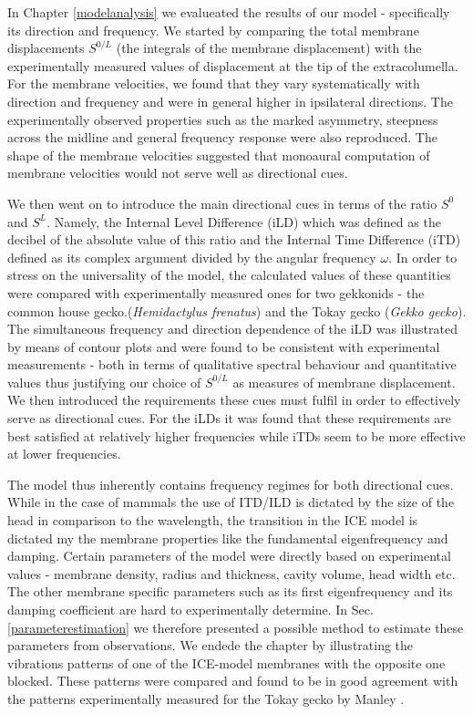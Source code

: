 In Chapter \ref{modelanalysis} we evalueated the results of our model - specifically its direction and frequency. We started
by comparing the total membrane displacements $S^{0/L}$ (the integrals of the membrane displacement) with the experimentally 
measured values of displacement at the tip of the extracolumella. 
For the membrane velocities, we found that they vary systematically with
direction and frequency and were in general higher in ipsilateral directions. The experimentally observed properties such
as the marked asymmetry, steepness across the midline and general frequency response were also reproduced. The shape of the membrane
velocities suggested that monoaural computation of membrane velocities would not serve well as directional cues.

We then went on to introduce the main directional cues in terms of the ratio $S^{0}$ and $S^{L}$. Namely, the Internal Level Difference
(iLD) which was defined as the decibel of the absolute value of this ratio and the Internal Time Difference (iTD) defined as its complex
argument divided by the angular frequency $\omega$. In order to stress on the universality of the model, the calculated values of these
 quantities were compared with experimentally measured ones for two gekkonids - the common house gecko.(\emph{Hemidactylus frenatus}) and the Tokay gecko
 (\emph{Gekko gecko}). The simultaneous frequency and direction dependence of the iLD was illustrated by
means of contour plots and were found to be consistent with experimental measurements - both in terms of qualitative spectral behaviour and
quantitative values thus justifying our choice of $S^{0/L}$ as measures of membrane displacement. We then introduced the requirements these cues must fulfil in order to effectively serve as
directional cues. For the iLDs it was found that these requirements are best satisfied at relatively higher frequencies while
 iTDs seem to be more effective at lower frequencies.
 
The model thus inherently contains frequency regimes for both directional cues. While in the case of mammals the use of ITD/ILD
is dictated by the size of the head in comparison to the wavelength, the transition in the ICE model is dictated my the membrane
properties like the fundamental eigenfrequency and damping. Certain parameters of the model were directly based on experimental
values - membrane density, radius and thickness, cavity volume, head width etc. The other membrane specific parameters such
as its first eigenfrequency and its damping coefficient are hard to experimentally determine. In Sec. \ref{parameterestimation} we therefore presented
a possible method to estimate these parameters from observations. We endede the chapter by illustrating the vibrations patterns of one of the ICE-model
membranes with the opposite one blocked. These patterns were compared and found to be in good agreement with the patterns experimentally measured for the Tokay gecko by Manley \cite{manleygecko1}.


